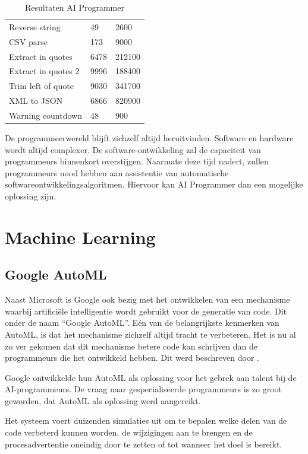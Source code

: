 \begin{table}[htb]
\begin{tabular}{lll}
		Reverse string              & 49       & 2600       \\
		CSV parse                   & 173      & 9000       \\
		Extract in quotes           & 6478     & 212100     \\
		Extract in quotes 2         & 9996     & 188400     \\
		Trim left of quote          & 9030     & 341700     \\
		XML to JSON                 & 6866     & 820900     \\
		Warning countdown           & 48       & 900       
	\end{tabular}
	\caption{Resultaten AI Programmer}
	\label{table:aiprog}
\end{table}

De programmeerwereld blijft zichzelf altijd heruitvinden. Software en hardware wordt altijd complexer. De software-ontwikkeling zal de capaciteit van programmeurs binnenkort overstijgen. Naarmate deze tijd nadert, zullen programmeurs nood hebben aan assistentie van automatische softwareontwikkelingsalgoritmen. Hiervoor kan AI Programmer dan een mogelijke oplossing zijn.

\section{Machine Learning}

\subsection{Google AutoML}

Naast Microsoft is Google ook bezig met het ontwikkelen van een mechanisme waarbij artificiële intelligentie wordt gebruikt voor de generatie van code. Dit onder de naam “Google AutoML”. Eén van de belangrijkste kenmerken van AutoML, is dat het mechanisme zichzelf altijd tracht te verbeteren. Het is nu al zo ver gekomen dat dit mechanisme betere code kan schrijven dan de programmeurs die het ontwikkeld hebben. Dit werd beschreven door \textcite{greene}.

Google ontwikkelde hun AutoML als oplossing voor het gebrek aan talent bij de AI-programmeurs. De vraag naar gespecialiseerde programmeurs is zo groot geworden, dat AutoML als oplossing werd aangereikt. 

Het systeem voert duizenden simulaties uit om te bepalen welke delen van de code verbeterd kunnen worden, de wijzigingen aan te brengen en de procesadvertentie oneindig door te zetten of tot wanneer het doel is bereikt. 

